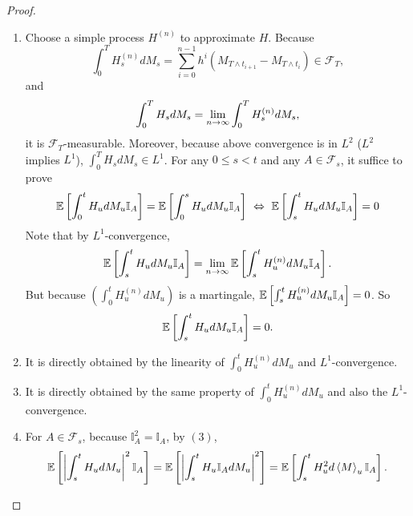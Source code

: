 \begin{proof}
    \begin{enumerate}[label=(\arabic{*})]
        \item Choose a simple process $H^{(n)}$ to approximate $H$. Because
        \begin{equation*}
            \int_0^T H_s^{(n)}dM_s = \sum_{i=0}^{n-1}h^i(M_{T \wedge t_{i+1}} - M_{T \wedge t_i}) \in \mathcal{F}_T,
        \end{equation*}
        and
        \begin{equation*}
            \int_0^T H_sdM_s = \lim_{n \rightarrow \infty} \int_0^T H_s^{(n)}dM_s,
        \end{equation*}
        it is $\mathcal{F}_T$-measurable. Moreover, because above convergence is in $L^2$ ($L^2$ implies $L^1$), $\int_0^T H_sdM_s \in L^1$. For any $0 \leq s < t$ and any $A \in \mathcal{F}_s$, it suffice to prove
        \begin{align*}
            \mathbb{E}\left[\int_0^t H_udM_u \mathbb{I}_A\right] =  \mathbb{E}\left[\int_0^s H_udM_u \mathbb{I}_A\right] ~\Leftrightarrow~ \mathbb{E}\left[\int_s^t H_udM_u \mathbb{I}_A\right] = 0
        \end{align*}
        Note that by $L^1$-convergence,
        \begin{equation*}
            \mathbb{E}\left[\int_s^t H_udM_u \mathbb{I}_A\right] = \lim_{n \rightarrow \infty} \mathbb{E}\left[\int_s^t H^{(n)}_udM_u \mathbb{I}_A\right].
        \end{equation*}
        But because $(\int_0^t H^{(n)}_udM_u)$ is a martingale, $\mathbb{E}\left[\int_s^t H^{(n)}_udM_u \mathbb{I}_A\right] = 0$. So
        \begin{equation*}
            \mathbb{E}\left[\int_s^t H_udM_u \mathbb{I}_A\right] = 0.
        \end{equation*}

        \item It is directly obtained by the linearity of $\int_0^t H^{(n)}_udM_u$ and $L^1$-convergence.

        \item It is directly obtained by the same property of $\int_0^t H^{(n)}_udM_u$ and also the $L^1$-convergence.

        \item For $A \in \mathcal{F}_s$, because $ \mathbb{I}_A^2 =  \mathbb{I}_A$, by $(3)$,
        \begin{equation*}
            \mathbb{E}\left[\left\lvert\int_s^t H_u dM_u\right\lvert^2 \mathbb{I}_A\right] =  \mathbb{E}\left[\left\lvert\int_s^t H_u \mathbb{I}_A dM_u\right\lvert^2\right] =\mathbb{E}\left[\int_s^t H^2_u d\left\langle M \right\rangle_u \mathbb{I}_A\right].
        \end{equation*}


\end{enumerate}
\end{proof}
